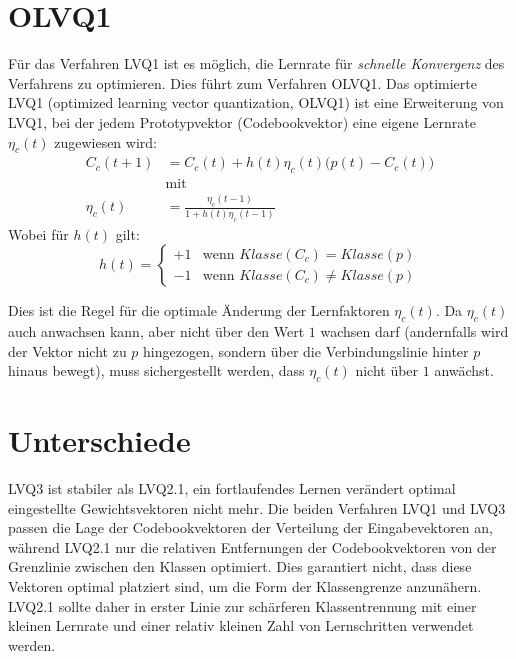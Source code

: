 \section*{OLVQ1}
Für das Verfahren LVQ1 ist es möglich, die Lernrate für \emph{schnelle Konvergenz} des Verfahrens zu optimieren. Dies führt zum Verfahren OLVQ1. Das optimierte LVQ1 (optimized learning vector quantization, OLVQ1) ist eine Erweiterung von LVQ1, bei der jedem Prototypvektor (Codebookvektor) eine eigene Lernrate $\eta_c(t)$ zugewiesen wird:
\begin{align*}
	C_c(t+1) &= C_c(t) + h(t) \eta_c(t) \Big( p(t) - C_c(t) \Big)\\
	&\text{mit} \\
	\eta_c(t) &= \frac{\eta_c(t-1)}{1 + h(t) \eta_c(t-1)}
\end{align*}
\noindent
Wobei für $h(t)$ gilt:
\[
	h(t) = 
	\begin{cases}
		+1 &\text{wenn } Klasse(C_c) = Klasse(p) \\
		-1 &\text{wenn } Klasse(C_c) \ne Klasse(p)
	\end{cases}
\]

Dies ist die Regel für die optimale Änderung der Lernfaktoren $\eta_c(t)$. Da $\eta_c(t)$ auch anwachsen kann, aber nicht über den Wert $1$ wachsen
darf (andernfalls wird der Vektor nicht zu $p$ hingezogen, sondern über die Verbindungslinie hinter $p$ hinaus bewegt), muss sichergestellt werden, dass $\eta_c(t)$ nicht über $1$ anwächst. 



\section*{Unterschiede}
LVQ3 ist stabiler als LVQ2.1, ein fortlaufendes Lernen verändert optimal eingestellte Gewichtsvektoren nicht mehr.
Die beiden Verfahren LVQ1 und LVQ3 passen die Lage der Codebookvektoren der Verteilung der Eingabevektoren an, während LVQ2.1 nur die relativen Entfernungen der Codebookvektoren von der Grenzlinie zwischen den Klassen optimiert. Dies garantiert nicht, dass diese Vektoren optimal platziert sind, um die Form der Klassengrenze anzunähern. LVQ2.1 sollte daher in erster Linie zur schärferen Klassentrennung mit einer kleinen Lernrate und einer relativ kleinen Zahl von Lernschritten verwendet werden.


